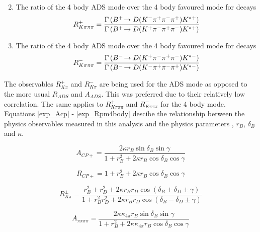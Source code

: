 \begin{enumerate}
{{\begin{equation}
\label{eqn:Rpipipipi}
\end{equation}}
}
\item{The ratio of the 4 body ADS mode over the 4 body favoured mode for \Bp decays
\begin{equation}
R^+_{K\pi\pi\pi} = \frac{\Gamma\left({{{B}^+}}\!\rightarrow {\ensuremath{D}}({{K}^-}{{\pi}^+}{{\pi}^-}{{\pi}^+}){{K}^{*+}}\right)}{\Gamma\left({{{B}^+}}\!\rightarrow {\ensuremath{D}}({{K}^+}{{\pi}^-}{{\pi}^+}{{\pi}^-}){{K}^{*+}}\right)}
\label{eqn:Rplus4body}
\end{equation}
}
\item{The ratio of the 4 body ADS mode over the 4 body favoured mode for \Bm decays
\begin{equation}
R^-_{K\pi\pi\pi} = \frac{\Gamma\left({{{B}^-}}\!\rightarrow {\ensuremath{D}}({{K}^+}{{\pi}^-}{{\pi}^+}{{\pi}^-}){{K}^{*-}}\right)}{\Gamma\left({{{B}^-}}\!\rightarrow {\ensuremath{D}}({{K}^-}{{\pi}^+}{{\pi}^-}{{\pi}^+}){{K}^{*-}}\right)}
\label{eqn:Rminus4body}
\end{equation}
}
\end{enumerate}

The observables $R^+_{K\pi}$ and $R^-_{K\pi}$ are being used for the ADS mode as opposed to the more usual $R_{ADS}$ and $A_{ADS}$. This was preferred due to their relatively low correlation. The same applies to $R^+_{K\pi\pi\pi}$ and $R^-_{K\pi\pi\pi}$ for the 4 body mode. Equations \ref{exp_Acp} - \ref{exp_Rpm4body} descibe the relationship between the physics observables measured in this analysis and the physics parameters \Pgamma, $r_B$, $\delta_B$ and $\kappa$.

\begin{equation}
A_{CP+} = \frac{2 \kappa r_B\sin\delta_B\sin\gamma}{1 + r_B^2 + 2 \kappa r_B\cos\delta_B\cos\gamma}
\label{exp_Acp}
\end{equation}

\begin{equation}
R_{CP+} = 1 + r_B^2 + 2 \kappa r_B\cos\delta_B\cos\gamma
\label{exp_Rcp}
\end{equation}

\begin{equation}
R^{\pm}_{K\pi} = \frac{r_B^2 + r_D^2 + 2\kappa r_B r_D \cos(\delta_B + \delta_D \pm \gamma)}{1 + r_B^2r_D^2 + 2\kappa r_B r_D \cos(\delta_B - \delta_D \pm \gamma)}
\label{exp_Rpm}
\end{equation}

\begin{equation}
A_{\pi\pi\pi\pi} = \frac{2 \kappa\kappa_{4\pi} r_B\sin\delta_B\sin\gamma}{1 + r_B^2 + 2 \kappa\kappa_{4\pi} r_B\cos\delta_B\cos\gamma}
\label{exp_A4pi}
\end{equation}

